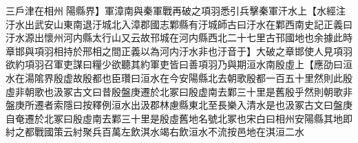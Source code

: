 三戶津在相州陽縣界】軍漳南與秦軍戰再破之項羽悉引兵擊秦軍汗水上【水經注汙水出武安山東南退汙城北入漳郡國志鄴縣有汙城師古曰汙水在鄴西南史記正義曰汙水源出懷州河内縣太行山又云故邗城在河内縣西北二十七里古邗國地也余據此時章邯與項羽相持於邢相之間正義以為河内汙水非也汙音于】大破之章邯使人見項羽欲約項羽召軍吏謀曰糧少欲聽其約軍吏皆曰善項羽乃與期洹水南殷虛上【應劭曰洹水在湯隂界殷虚故殷都也臣瓚曰洹水在今安陽縣北去朝歌殷都一百五十里然則此殷虛非朝歌也汲冢古文曰昔殷盤庚遷於北冢曰殷虚南去鄴三十里是舊殷乎然則朝歌非盤庚所遷者索隱曰按釋例洹水出汲郡林慮縣東北至長樂入清水是也汲冢古文曰盤庚自奄遷於北冢曰殷虛南去鄴三十里是殷虛舊地名號北冢也宋白曰相州安陽縣其地即紂之都戰國策云紂聚兵百萬左飲淇水竭右飲洹水不流按邑地在淇洹二水